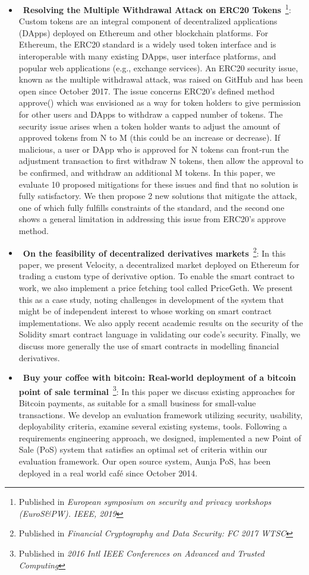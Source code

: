 \begin{itemize}
    \item{~\textbf{Resolving the Multiple Withdrawal Attack on ERC20 Tokens}~\cite{rahimian2019resolving}\footnote{Published in \textit{European symposium on security and privacy workshops (EuroS{\&}PW). IEEE, 2019}}}: Custom tokens are an integral component of decentralized applications (DApps) deployed on Ethereum and other blockchain platforms. For Ethereum, the ERC20 standard is a widely used token interface and is interoperable with many existing DApps, user interface platforms, and popular web applications (e.g., exchange services). An ERC20 security issue, known as the multiple withdrawal attack, was raised on GitHub and has been open since October 2017. The issue concerns ERC20's defined method approve() which was envisioned as a way for token holders to give permission for other users and DApps to withdraw a capped number of tokens. The security issue arises when a token holder wants to adjust the amount of approved tokens from N to M (this could be an increase or decrease). If malicious, a user or DApp who is approved for N tokens can front-run the adjustment transaction to first withdraw N tokens, then allow the approval to be confirmed, and withdraw an additional M tokens. In this paper, we evaluate 10 proposed mitigations for these issues and find that no solution is fully satisfactory. We then propose 2 new solutions that mitigate the attack, one of which fully fulfills constraints of the standard, and the second one shows a general limitation in addressing this issue from ERC20’s approve method.


    \item{~\textbf{On the feasibility of decentralized derivatives markets}~\cite{eskandari2017feasibility}\footnote{Published in \textit{Financial Cryptography and Data Security: FC 2017 WTSC}}}: In this paper, we present Velocity, a decentralized market deployed on Ethereum for trading a custom type of derivative option. To enable the smart contract to work, we also implement a price fetching tool called PriceGeth. We present this as a case study, noting challenges in development of the system that might be of independent interest to whose working on smart contract implementations. We also apply recent academic results on the security of the Solidity smart contract language in validating our code’s security. Finally, we discuss more generally the use of smart contracts in modelling financial derivatives.

    \item{~\textbf{Buy your coffee with bitcoin: Real-world deployment of a bitcoin point of sale terminal}~\cite{eskandari2016buy}\footnote{Published in \textit{2016 Intl IEEE Conferences on Advanced and Trusted Computing}}}: In this paper we discuss existing approaches for Bitcoin payments, as suitable for a small business for small-value transactions. We develop an evaluation framework utilizing security, usability, deployability criteria, examine several existing systems, tools. Following a requirements engineering approach, we designed, implemented a new Point of Sale (PoS) system that satisfies an optimal set of criteria within our evaluation framework. Our open source system, Aunja PoS, has been deployed in a real world café since October 2014.


\end{itemize}
